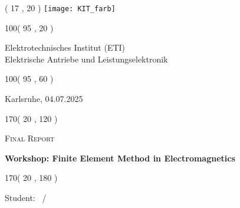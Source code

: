 %
%

\thispagestyle{empty}

\begin{textblock}{50}( 17 , 20 )
\texttt{[image: KIT\_farb]}
\end{textblock}

\begin{textblock}{100}( 95 , 20 )
\begin{flushright}
Elektrotechnisches Institut (ETI)\\
Elektrische Antriebe und Leistungselektronik
\end{flushright}
\end{textblock}


\begin{textblock}{100}( 95 , 60 )
\begin{flushright}
\large
Karlsruhe, 04.07.2025                         	%
\end{flushright}
\end{textblock}

\begin{textblock}{170}( 20 , 120 )
\begin{center}
    \begin{LARGE}
    \textsc{Final Report}\\		%
    \end{LARGE}
\vspace{0.5cm}
    \begin{huge}
    \textbf{Workshop: Finite Element Method in Electromagnetics}\\[1cm]            %
    \end{huge}
\end{center}
\end{textblock}

\begin{textblock}{170}( 20 , 180 )
\begin{center}
\large
Student: \Matrikelnr\, / \,\AuthorName \\           %
\end{center}
\end{textblock}

